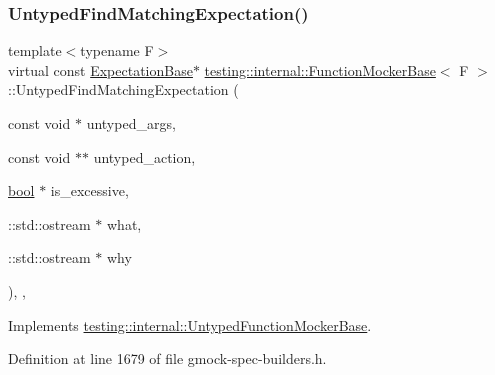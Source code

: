 \subsubsection{\texorpdfstring{Untyped\+Find\+Matching\+Expectation()}{UntypedFindMatchingExpectation()}}
{\footnotesize\ttfamily template$<$typename F$>$ \\
virtual const \hyperlink{classtesting_1_1internal_1_1ExpectationBase}{Expectation\+Base}$\ast$ \hyperlink{classtesting_1_1internal_1_1FunctionMockerBase}{testing\+::internal\+::\+Function\+Mocker\+Base}$<$ F $>$\+::Untyped\+Find\+Matching\+Expectation (\begin{DoxyParamCaption}\item[{const void $\ast$}]{untyped\+\_\+args,  }\item[{const void $\ast$$\ast$}]{untyped\+\_\+action,  }\item[{\hyperlink{classbool}{bool} $\ast$}]{is\+\_\+excessive,  }\item[{\+::std\+::ostream $\ast$}]{what,  }\item[{\+::std\+::ostream $\ast$}]{why }\end{DoxyParamCaption})\hspace{0.3cm}{\ttfamily [inline]}, {\ttfamily [private]}, {\ttfamily [virtual]}}



Implements \hyperlink{classtesting_1_1internal_1_1UntypedFunctionMockerBase_a38714b44836c937fe95524f8d7063d04}{testing\+::internal\+::\+Untyped\+Function\+Mocker\+Base}.



Definition at line 1679 of file gmock-\/spec-\/builders.\+h.


